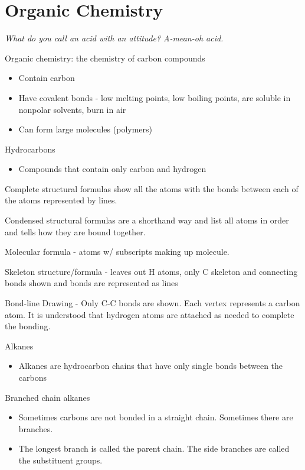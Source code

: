 \documentclass[../hchem.tex]{subfiles}
\begin{document}
\chapter{Organic Chemistry}
\textit{What do you call an acid with an attitude? A-mean-oh acid.}

Organic chemistry: the chemistry of carbon compounds
\begin{itemize}
    \item Contain carbon 
    \item Have covalent bonds - low melting points, low boiling points, are soluble in nonpolar solvents, burn in air 
    \item Can form large molecules (polymers)
\end{itemize}

Hydrocarbons
\begin{itemize}
    \item Compounds that contain only carbon and hydrogen 
\end{itemize}

Complete structural formulas show all the atoms with the bonds between each of the atoms represented by lines.

Condensed structural formulas are a shorthand way and list all atoms in order and tells how they are bound together.

Molecular formula - atoms w/ subscripts making up molecule.

Skeleton structure/formula - leaves out H atoms, only C skeleton and connecting bonds shown and bonds are represented as lines

Bond-line Drawing - Only C-C bonds are shown. Each vertex represents a carbon atom. It is understood that hydrogen atoms are attached as needed to complete the bonding.

Alkanes
\begin{itemize}
    \item Alkanes are hydrocarbon chains that have only single bonds between the carbons
\end{itemize}

Branched chain alkanes 
\begin{itemize}
    \item Sometimes carbons are not bonded in a straight chain. Sometimes there are branches.
    \item The longest branch is called the parent chain. The side branches are called the substituent groups.
\end{itemize}
\end{document}
